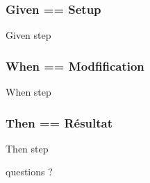 \documentclass{beamer}
\begin{document}
\begin{frame}
  \frametitle{Given == Setup}
  \begin{beamerboxesrounded}{Given step}
    
  \end{beamerboxesrounded}
\end{frame}

\begin{frame}
  \frametitle{When == Modfification}
  \begin{beamerboxesrounded}{When step}
    
  \end{beamerboxesrounded}
\end{frame}

\begin{frame}
  \frametitle{Then == R\'esultat}
  \begin{beamerboxesrounded}{Then step}
    
  \end{beamerboxesrounded}
\end{frame}

\begin{frame}
    \begin{center}
    \huge{}
    questions ?
    \end{center}
\end{frame}
\end{document}
